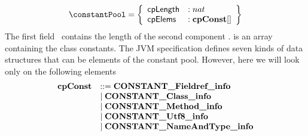 $$ 
\begin{array}{l}
         \constantPool = \left\{\begin{array}{ll} \cpLength    & :   nat \\
                                                  \cpElems   & :   \classConst [ ]
	                        \end{array} \right\}
   \end{array} 
$$
The first field \cpLength \  contains the length of the second component \cpElems. \cpElems
is an array containing the class constants.
The JVM specification defines seven kinds of data structures that can be elements of the constant pool.
However, here   we will look only on the following elements
$$ \begin{array}{ll}\mbox{\rm\textbf{cpConst}} & ::=   \mbox{\rm\textbf{CONSTANT\_Fieldref\_info}} \\
		     & \mid \mbox{\rm\textbf{CONSTANT\_Class\_info}} \\
		     & \mid \mbox{\rm\textbf{CONSTANT\_Method\_info}}\\
		      & \mid \mbox{\rm \textbf{CONSTANT\_Utf8\_info}} \\
		      & \mid \mbox{\rm \textbf{CONSTANT\_NameAndType\_info}}
                    \end{array}$$


